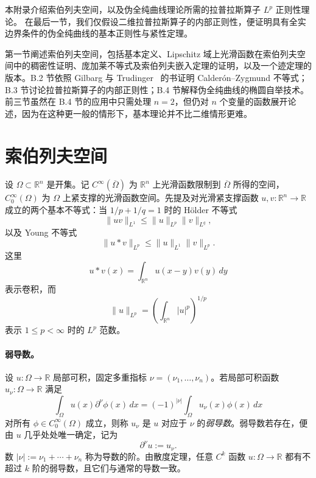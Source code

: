 
本附录介绍索伯列夫空间，以及伪全纯曲线理论所需的拉普拉斯算子 $L^p$ 正则性理论。
在最后一节，我们仅假设二维拉普拉斯算子的内部正则性，便证明具有全实边界条件的伪全纯曲线的基本正则性与紧性定理。

第一节阐述索伯列夫空间，包括基本定义、Lipschitz 域上光滑函数在索伯列夫空间中的稠密性证明、庞加莱不等式及索伯列夫嵌入定理的证明，以及一个迹定理的版本。B.2 节依照 Gilbarg 与 Trudinger~ 的书证明 Calderón--Zygmund 不等式；B.3 节讨论拉普拉斯算子的内部正则性；B.4 节解释伪全纯曲线的椭圆自举技术。前三节虽然在 B.4 节的应用中只需处理 $n=2$，但仍对 $n$ 个变量的函数展开论述，因为在这种更一般的情形下，基本理论并不比二维情形更难。

\section{索伯列夫空间}\label{sec:B-1}

设 $\Omega\subset\mathbb R^n$ 是开集。记 $C^\infty(\overline\Omega)$ 为 $\mathbb R^n$ 上光滑函数限制到 $\overline\Omega$ 所得的空间，$C_0^\infty(\Omega)$ 为 $\Omega$ 上紧支撑的光滑函数空间。先提及对光滑紧支撑函数 $u,v:\mathbb R^n\to\mathbb R$ 成立的两个基本不等式：当 $1/p+1/q=1$ 时的 Hölder 不等式
\[
  \|uv\|_{L^1}\le\|u\|_{L^p}\|v\|_{L^q},
\]
以及 Young 不等式
\[
  \|u*v\|_{L^p}\le\|u\|_{L^1}\|v\|_{L^p}.
\]
这里
\[
  u*v(x)=\int_{\mathbb R^n}u(x-y)v(y)\,dy
\]
表示卷积，而
\[
  \|u\|_{L^p}=\left(\int_{\mathbb R^n}|u|^p\right)^{1/p}
\]
表示 $1\le p<\infty$ 时的 $L^p$ 范数。

\paragraph{弱导数。} 设 $u:\Omega\to\mathbb R$ 局部可积，固定多重指标 $\nu=(\nu_1,\ldots,\nu_n)$。若局部可积函数 $u_\nu:\Omega\to\mathbb R$ 满足
\[
  \int_\Omega u(x)\partial^\nu\phi(x)\,dx
  =(-1)^{|\nu|}\int_\Omega u_\nu(x)\phi(x)\,dx
\]
对所有 $\phi\in C_0^\infty(\Omega)$ 成立，则称 $u_\nu$ 是 $u$ 对应于 $\nu$ 的\emph{弱导数}。弱导数若存在，便由 $u$ 几乎处处唯一确定，记为
\[
  \partial^\nu u:=u_\nu.
\]
数 $|\nu|:=\nu_1+\cdots+\nu_n$ 称为导数的阶。由散度定理，任意 $C^k$ 函数 $u:\Omega\to\mathbb R$ 都有不超过 $k$ 阶的弱导数，且它们与通常的导数一致。


